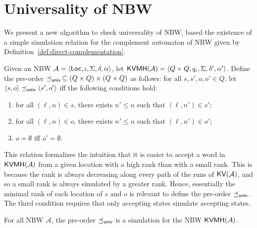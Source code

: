 \documentclass{LMCS}
\renewcommand{\l}{{\ell}}
\newcommand{\Loc}{{\sf Loc}}
\newcommand{\tuple}[1]{\langle #1 \rangle}
\newcommand{\A}{\mathcal{A}}
\newcommand{\KV}{{\sf KV}}
\newcommand{\KVMH}{{\sf KVMH}}
\begin{document}
\section{Universality of NBW}\label{sec:universality}

We present a new algorithm to check universality of NBW, based
the existence of a simple simulation relation for the complement
automaton of NBW given by Definition~\ref{def:direct-complementation}.

\begin{defi}\label{def:simulation-for-KVMH}
Given an NBW $\A = \tuple{\Loc, \iota, \Sigma, \delta, \alpha}$,
let $\KVMH(\A) = \tuple{Q \times Q, q_{\iota}, \Sigma, \delta', \alpha'}$.
Define the pre-order $\preceq_{{\sf univ}}\, \subseteq (Q \times Q) \times (Q \times Q)$ as follows: 
for all $s,s',o,o' \in Q$, let 
$\tuple{s,o} \preceq_{{\sf univ}} \tuple{s',o'}$ 
iff the following conditions hold:
  \begin{enumerate}[$\bullet$]
    \item for all $(\l,n) \in s$, there exists $n' \leq n$ such that $(\l,n') \in s'$;
    \item for all $(\l,n) \in o$, there exists $n' \leq n$ such that $(\l,n') \in o'$;
    \item $o=\emptyset$ iff $o'=\emptyset$.
  \end{enumerate}
\end{defi}

This relation formalizes the intuition that it is easier to accept a word 
in $\KVMH(\A)$ from a given location with a high rank than with a small rank. 
This is because the rank is always decreasing along every path of the runs 
of $\KV(\A)$, and so a small rank is always simulated by a greater rank.
Hence, essentially the minimal rank of each location of $s$ and $o$ is relevant
to define the pre-order $\preceq_{{\sf univ}}$. The third condition requires
that only accepting states simulate accepting states.



\begin{lem}\label{lem:univ-simulation-relation}
For all NBW $\A$, 
the pre-order $\preceq_{{\sf univ}}$ is a simulation for the NBW $\KVMH(\A)$.
\end{lem} 
\end{document}
